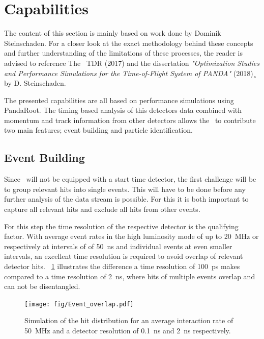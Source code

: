 \documentclass[../BTOF_summary.tex]{subfiles}
\begin{document}
\section{Capabilities}

The content of this section is mainly based on work done by Dominik Steinschaden.
For a closer look at the exact methodology behind these concepts and further understanding of the limitations of these processes, the reader is advised to reference The \btof\ TDR (2017) and the dissertation \emph{"Optimization Studies and Performance Simulations for the Time-of-Flight System of PANDA"} (2018)¸ by D. Steinschaden.

The presented capabilities are all based on performance simulations using PandaRoot. The timing based analysis of this detectors data combined with momentum and track information from other detectors allows the \btofD\ to contribute two main features; event building and particle identification.

\subsection{Event Building}

Since \panda\ will not be equipped with a start time detector, the first challenge will be to group relevant hits into single events. This will have to be done before any further analysis of the data stream is possible. For this it is both important to capture all relevant hits and exclude all hits from other events.

For this step the time resolution of the respective detector is the qualifying factor. With average event rates in the high luminosity mode of up to \SI{20}{MHz} or respectively at intervals of of \SI{50}{ns} and individual events at even smaller intervals, an excellent time resolution is required to avoid overlap of relevant detector hits. \fig~\ref{fig:Event_overlap} illustrates the difference a time resolution of \SI{100}{ps} makes compared to a time resolution of \SI{2}{ns}, where hits of multiple events overlap and can not be disentangled.

\begin{figure}[htbp]
	\centering
	\texttt{[image: fig/Event\_overlap.pdf]}
	\caption{Simulation of the hit distribution for an average interaction rate of \SI{50}{MHz} and a detector resolution of \SI{0.1}{ns} and \SI{2}{ns} respectively.}
	\label{fig:Event_overlap}
\end{figure}
\end{document}
